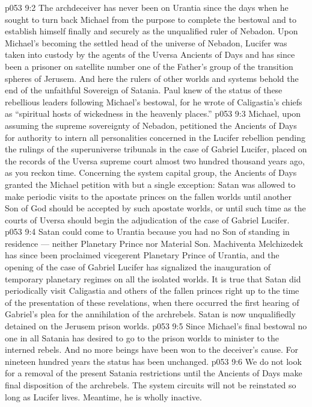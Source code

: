 \vs p053 9:2 \pc The archdeceiver has never been on Urantia since the days when he sought to turn back Michael from the purpose to complete the bestowal and to establish himself finally and securely as the unqualified ruler of Nebadon. Upon Michael’s becoming the settled head of the universe of Nebadon, Lucifer was taken into custody by the agents of the Uversa Ancients of Days and has since been a prisoner on satellite number one of the Father’s group of the transition spheres of Jerusem. And here the rulers of other worlds and systems behold the end of the unfaithful Sovereign of Satania. Paul knew of the status of these rebellious leaders following Michael’s bestowal, for he wrote of Caligastia’s chiefs as “spiritual hosts of wickedness in the heavenly places.”
\vs p053 9:3 \pc Michael, upon assuming the supreme sovereignty of Nebadon, petitioned the Ancients of Days for authority to intern all personalities concerned in the Lucifer rebellion pending the rulings of the superuniverse tribunals in the case of Gabriel  Lucifer, placed on the records of the Uversa supreme court almost two hundred thousand years ago, as you reckon time. Concerning the system capital group, the Ancients of Days granted the Michael petition with but a single exception: Satan was allowed to make periodic visits to the apostate princes on the fallen worlds until another Son of God should be accepted by such apostate worlds, or until such time as the courts of Uversa should begin the adjudication of the case of Gabriel  Lucifer.
\vs p053 9:4 Satan could come to Urantia because you had no Son of standing in residence --- neither Planetary Prince nor Material Son. Machiventa Melchizedek has since been proclaimed vicegerent Planetary Prince of Urantia, and the opening of the case of Gabriel  Lucifer has signalized the inauguration of temporary planetary regimes on all the isolated worlds. It is true that Satan did periodically visit Caligastia and others of the fallen princes right up to the time of the presentation of these revelations, when there occurred the first hearing of Gabriel’s plea for the annihilation of the archrebels. Satan is now unqualifiedly detained on the Jerusem prison worlds.
\vs p053 9:5 \pc Since Michael’s final bestowal no one in all Satania has desired to go to the prison worlds to minister to the interned rebels. And no more beings have been won to the deceiver’s cause. For nineteen hundred years the status has been unchanged.
\vs p053 9:6 We do not look for a removal of the present Satania restrictions until the Ancients of Days make final disposition of the archrebels. The system circuits will not be reinstated so long as Lucifer lives. Meantime, he is wholly inactive.
